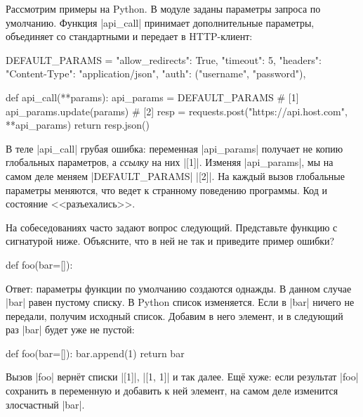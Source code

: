 Рассмотрим примеры на Python. В модуле заданы параметры запроса по
умолчанию. Функция \spverb|api_call| принимает дополнительные параметры,
объединяет со стандартными и передает в HTTP-клиент:

\begin{english}
  \begin{python}
DEFAULT_PARAMS = {
    "allow_redirects": True,
    "timeout": 5,
    "headers": {"Content-Type": "application/json"},
    "auth": ("username", "password"),
}

def api_call(**params):
    api_params = DEFAULT_PARAMS # [1]
    api_params.update(params)   # [2]
    resp = requests.post("https://api.host.com", **api_params)
    return resp.json()
  \end{python}
\end{english}

В теле \spverb|api_call| грубая ошибка: переменная \spverb|api_params| получает
не копию глобальных параметров, а \emph{ссылку} на них \spverb|[1]|. Изменяя
\spverb|api_params|, мы на самом деле меняем \spverb|DEFAULT_PARAMS|
\spverb|[2]|. На каждый вызов глобальные параметры меняются, что ведет к
странному поведению программы. Код и состояние <<разъехались>>.

На собеседованиях часто задают вопрос следующий. Представьте функцию с
сигнатурой ниже. Объясните, что в ней не так и приведите пример ошибки?

\begin{english}
  \begin{python}
def foo(bar=[]):
  \end{python}
\end{english}

Ответ: параметры функции по умолчанию создаются однажды. В данном случае
\spverb|bar| равен пустому списку. В Python список изменяется. Если в
\spverb|bar| ничего не передали, получим исходный список. Добавим в него
элемент, и в следующий раз \spverb|bar| будет уже не пустой:

\begin{english}
  \begin{python}
def foo(bar=[]):
    bar.append(1)
    return bar
  \end{python}
\end{english}

Вызов \spverb|foo| верн\"{е}т списки \spverb|[1]|, \spverb|[1, 1]| и так далее. Ещ\"{е}
хуже: если результат \spverb|foo| сохранить в переменную и добавить к ней
элемент, на самом деле изменится злосчастный \spverb|bar|.

